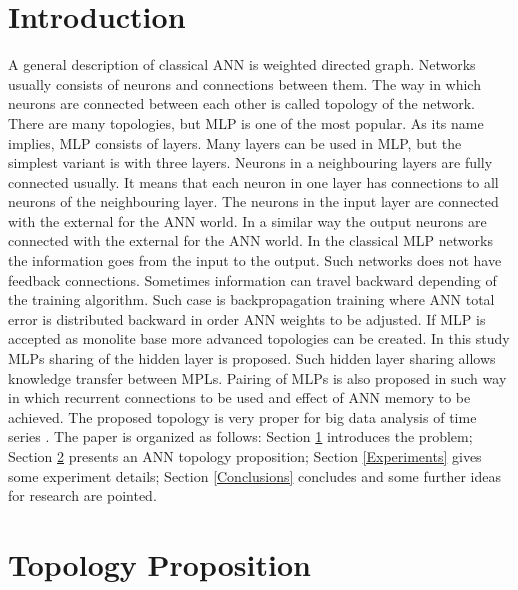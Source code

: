 \documentclass{llncs}
\begin{document}

\section{Introduction} \label{Introduction}

A general description of classical ANN is weighted directed graph. Networks usually consists of neurons and connections between them. The way in which neurons are connected between each other is called topology of the network. There are many topologies, but MLP is one of the most popular. As its name implies, MLP consists of layers. Many layers can be used in MLP, but the simplest variant is with three layers. Neurons in a neighbouring layers are fully connected usually. It means that each neuron in one layer has connections to all neurons of the neighbouring layer. The neurons in the input layer are connected with the external for the ANN world. In a similar way the output neurons are connected with the external for the ANN world. In the classical MLP networks the information goes from the input to the output. Such networks does not have feedback connections. Sometimes information can travel backward depending of the training algorithm. Such case is backpropagation training where ANN total error is distributed backward in order ANN weights to be adjusted. If MLP is accepted as monolite base more advanced topologies can be created. In this study MLPs sharing of the hidden layer is proposed. Such hidden layer sharing allows knowledge transfer between MPLs. Pairing of MLPs is also proposed in such way in which recurrent connections to be used and effect of ANN memory to be achieved. The proposed topology is very proper for big data analysis of time series \cite{atanasova01}. The paper is organized as follows: Section \ref{Introduction} introduces the problem; Section \ref{Topology Proposition} presents an ANN topology proposition; Section \ref{Experiments} gives some experiment details; Section \ref{Conclusions} concludes and some further ideas for research are pointed.

\section{Topology Proposition} \label{Topology Proposition}
\end{document}
